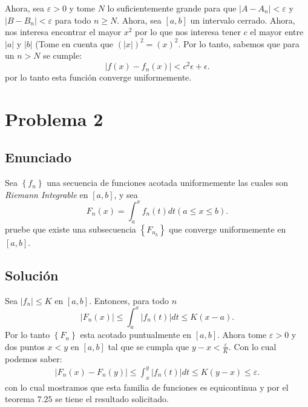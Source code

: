 \documentclass{report}
\begin{document}
Ahora, sea $\varepsilon > 0$ y tome $N$ lo suficientemente grande para que  $\left| A - A_n \right| < \varepsilon$ y $\left| B - B_n \right| < \varepsilon$ para todo $n \ge N$. Ahora, sea  $\left[ a, b \right] $ un intervalo cerrado. Ahora, nos interesa encontrar el mayor $x^2$ por lo que nos interesa tener $c$ el mayor entre $|a|$ y $|b|$ (Tome en cuenta que $\left( |x| \right)^2 = \left( x \right)^2 $. Por lo tanto, sabemos que para un $n > N$ se cumple: \[
\left| f\left( x \right) - f_n \left( x \right)  \right|  < c^2\epsilon + \epsilon
.\] por lo tanto esta función converge uniformemente.

\chapter{Problema 2}
\section{Enunciado}

Sea $\left\{ f_n \right\} $ una secuencia de funciones acotada uniformemente las cuales son \textit{Riemann Integrable} en $\left[ a, b \right] $, y sea \[
F_n\left( x \right) = \int_a^{x}f_n\left( t \right) dt \left( a \le x \le b \right) 
.\] pruebe que existe una subsecuencia $\left\{ F_{n_k} \right\} $ que converge uniformemente en $\left[ a, b \right] $.

\section{Solución}


Sea $\left| f_n \right| \le K$ en $\left[ a, b \right] $. Entonces, para todo $n$ \[
\left| F_n\left( x \right)  \right| \le \int_{a}^{x}\left| f_n\left( t \right)  \right| dt \le K\left( x - a \right) 
.\] Por lo tanto $\left\{ F_n \right\} $ esta acotado puntualmente en $\left[ a, b \right] $. Ahora tome $\varepsilon > 0$ y dos puntos $x < y$ en $\left[ a, b \right] $ tal que se cumpla que $y - x < \frac{\varepsilon}{K}$. Con lo cual podemos saber:
\begin{align*}
  \left| F_{n}\left( x \right)  - F_n\left( y \right)  \right| \le \int_{x}^{y}\left| f_n\left( t \right)  \right| dt \le K\left( y - x \right) \le \varepsilon
.\end{align*} con lo cual mostramos que esta familia de funciones es equicontinua y por el teorema $7.25$ se tiene el resultado solicitado.
\end{document}
